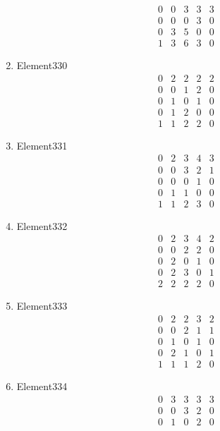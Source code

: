 \documentclass[12pt]{article}
\begin{document}
\begin{multicols}{3}
\begin{enumerate}
\begin{equation*}
\begin{array}{ccccc}
0&0&3&3&3\\
0&0&0&3&0\\
0&3&5&0&0\\
1&3&6&3&0
\end{array}
\end{equation*}
\item Element330
\begin{equation*}
\begin{array}{ccccc}
0&2&2&2&2\\
0&0&1&2&0\\
0&1&0&1&0\\
0&1&2&0&0\\
1&1&2&2&0
\end{array}
\end{equation*}
\item Element331
\begin{equation*}
\begin{array}{ccccc}
0&2&3&4&3\\
0&0&3&2&1\\
0&0&0&1&0\\
0&1&1&0&0\\
1&1&2&3&0
\end{array}
\end{equation*}
\item Element332
\begin{equation*}
\begin{array}{ccccc}
0&2&3&4&2\\
0&0&2&2&0\\
0&2&0&1&0\\
0&2&3&0&1\\
2&2&2&2&0
\end{array}
\end{equation*}
\item Element333
\begin{equation*}
\begin{array}{ccccc}
0&2&2&3&2\\
0&0&2&1&1\\
0&1&0&1&0\\
0&2&1&0&1\\
1&1&1&2&0
\end{array}
\end{equation*}
\item Element334
\begin{equation*}
\begin{array}{ccccc}
0&3&3&3&3\\
0&0&3&2&0\\
0&1&0&2&0\\

\end{array}
\end{equation*}
\end{enumerate}
\end{multicols}
\end{document}

